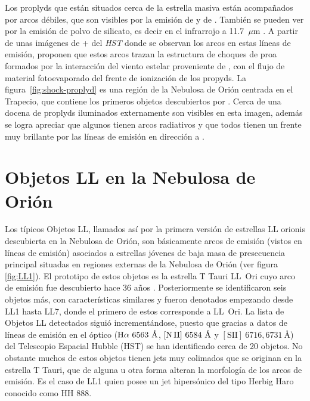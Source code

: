 Los proplyds que están situados cerca de la estrella masiva \thC{} están acompañados por arcos débiles, que son visibles por la emisión de \oiii{} y de \ha{}. También se pueden ver por la emisión de polvo de silicato, es decir en el infrarrojo a 11.7~\(\mu \text{m}\) \citep{Arredondo:2001, Hayward:1994}. A partir de unas imágenes de \ha{}+\nii{}  del \textit{HST} donde se observan los arcos en estas líneas de emisión, \citet{Bally:1998a} proponen que estos arcos trazan la estructura de choques de proa formados por la interacción del viento estelar proveniente de \thC{}, con el flujo de material fotoevaporado del frente de ionización de los propyds. La figura~\ref{fig:shock-proplyd} es una región de la Nebulosa de Orión centrada en el Trapecio, que contiene los primeros objetos descubiertos por \citet{Laques:1979}. Cerca de una docena de proplyds iluminados externamente son visibles en esta imagen, además se logra apreciar que algunos tienen arcos radiativos y que todos tienen un frente muy brillante por las líneas de emisión en dirección a \thC{}.         

\section{Objetos LL  en la  Nebulosa de Orión}
\label{sec:objeto-ll}

Los típicos Objetos LL, llamados así por la primera versión de estrellas LL orionis descubierta en la Nebulosa de Orión, son básicamente arcos de emisión (vistos en líneas de emisión) asociados a estrellas jóvenes de baja masa de presecuencia principal situadas en regiones externas de la Nebulosa de Orión \citep{Henney:2013a} (ver figura \ref{fig:LL1}). El prototipo de estos objetos es la estrella T Tauri LL~Ori cuyo arco de emisión fue descubierto hace 36 años \citep{Gull:1979a}. Posteriormente se identificaron seis objetos más, con características similares \citep{Bally:2001a} y fueron denotados empezando desde LL1 hasta LL7, donde el primero de estos corresponde a LL~Ori. La lista de Objetos LL detectados siguió incrementándose, puesto que gracias a datos de líneas de emisión en el óptico (\(\mathrm{H}\alpha~6563~\text{\AA{}}\), \(\mathrm{[N\,II]}~6584~\text{\AA{}}\) y \([\text{SII}]~6716,6731~\text{\AA{}}\)) del Telescopio Espacial Hubble (HST) \citep{Bally:2000a, Bally:2006a} se han identificado cerca de 20 objetos. No obstante muchos de estos objetos tienen jets muy colimados que se originan en la estrella T Tauri, que de alguna u otra forma alteran la morfología de los arcos de emisión. Es el caso de LL1 quien posee un jet hipersónico del tipo Herbig Haro conocido como HH 888.\\

